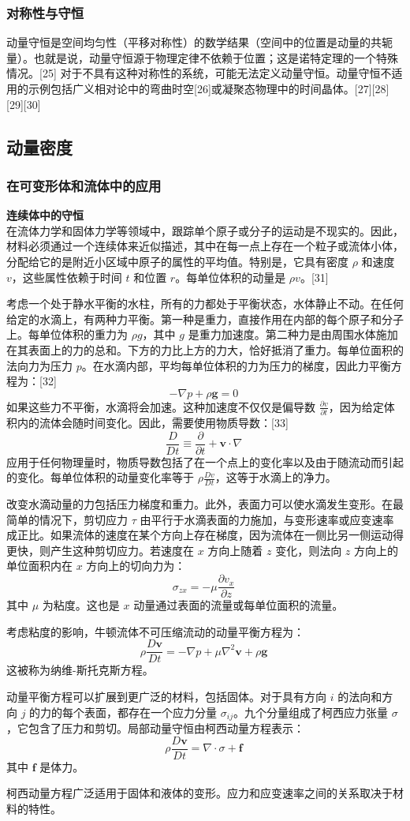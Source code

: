 \subsubsection{对称性与守恒}
动量守恒是空间均匀性（平移对称性）的数学结果（空间中的位置是动量的共轭量）。也就是说，动量守恒源于物理定律不依赖于位置；这是诺特定理的一个特殊情况。[25] 对于不具有这种对称性的系统，可能无法定义动量守恒。动量守恒不适用的示例包括广义相对论中的弯曲时空[26]或凝聚态物理中的时间晶体。[27][28][29][30]
\subsection{动量密度}
\subsubsection{在可变形体和流体中的应用}
\textbf{连续体中的守恒}\\
在流体力学和固体力学等领域中，跟踪单个原子或分子的运动是不现实的。因此，材料必须通过一个连续体来近似描述，其中在每一点上存在一个粒子或流体小体，分配给它的是附近小区域中原子的属性的平均值。特别是，它具有密度 \(\rho\) 和速度 \(v\)，这些属性依赖于时间 \(t\) 和位置 \(r\)。每单位体积的动量是 \(\rho v\)。[31]

考虑一个处于静水平衡的水柱，所有的力都处于平衡状态，水体静止不动。在任何给定的水滴上，有两种力平衡。第一种是重力，直接作用在内部的每个原子和分子上。每单位体积的重力为 \(\rho g\)，其中 \(g\) 是重力加速度。第二种力是由周围水体施加在其表面上的力的总和。下方的力比上方的力大，恰好抵消了重力。每单位面积的法向力为压力 \(p\)。在水滴内部，平均每单位体积的力为压力的梯度，因此力平衡方程为：[32]
\[
-\nabla p + \rho \mathbf{g} = 0~
\]
如果这些力不平衡，水滴将会加速。这种加速度不仅仅是偏导数 \(\frac{\partial v}{\partial t}\)，因为给定体积内的流体会随时间变化。因此，需要使用物质导数：[33]
\[
\frac{D}{Dt} \equiv \frac{\partial}{\partial t} + \mathbf{v} \cdot \nabla~
\]
应用于任何物理量时，物质导数包括了在一个点上的变化率以及由于随流动而引起的变化。每单位体积的动量变化率等于 \(\rho \frac{Dv}{Dt}\)，这等于水滴上的净力。

改变水滴动量的力包括压力梯度和重力。此外，表面力可以使水滴发生变形。在最简单的情况下，剪切应力 \(\tau\) 由平行于水滴表面的力施加，与变形速率或应变速率成正比。如果流体的速度在某个方向上存在梯度，因为流体在一侧比另一侧运动得更快，则产生这种剪切应力。若速度在 \(x\) 方向上随着 \(z\) 变化，则法向 \(z\) 方向上的单位面积内在 \(x\) 方向上的切向力为：
\[
\sigma_{zx} = -\mu \frac{\partial v_x}{\partial z}~
\]
其中 \(\mu\) 为粘度。这也是 \(x\) 动量通过表面的流量或每单位面积的流量。

考虑粘度的影响，牛顿流体不可压缩流动的动量平衡方程为：
\[
\rho \frac{D\mathbf{v}}{Dt} = -\nabla p + \mu \nabla^2 \mathbf{v} + \rho \mathbf{g}~
\]
这被称为纳维-斯托克斯方程。

动量平衡方程可以扩展到更广泛的材料，包括固体。对于具有方向 \(i\) 的法向和方向 \(j\) 的力的每个表面，都存在一个应力分量 \(\sigma_{ij}\)。九个分量组成了柯西应力张量 \(\sigma\)，它包含了压力和剪切。局部动量守恒由柯西动量方程表示：
\[
\rho \frac{D\mathbf{v}}{Dt} = \nabla \cdot \sigma + \mathbf{f}~
\]
其中 \(\mathbf{f}\) 是体力。

柯西动量方程广泛适用于固体和液体的变形。应力和应变速率之间的关系取决于材料的特性。
